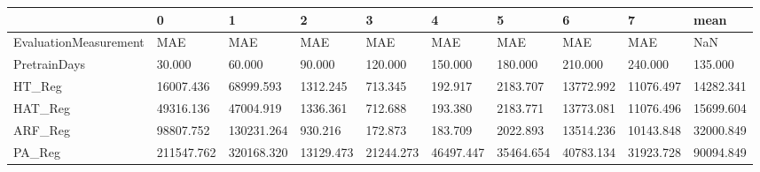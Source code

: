 \begin{tabular}{llllllllll}
\toprule
{} &          0 &          1 &         2 &         3 &         4 &         5 &         6 &         7 &      mean \\
\midrule
EvaluationMeasurement &        MAE &        MAE &       MAE &       MAE &       MAE &       MAE &       MAE &       MAE &       NaN \\
PretrainDays          &     30.000 &     60.000 &    90.000 &   120.000 &   150.000 &   180.000 &   210.000 &   240.000 &   135.000 \\
HT\_Reg                &  16007.436 &  68999.593 &  1312.245 &   713.345 &   192.917 &  2183.707 & 13772.992 & 11076.497 & 14282.341 \\
HAT\_Reg               &  49316.136 &  47004.919 &  1336.361 &   712.688 &   193.380 &  2183.771 & 13773.081 & 11076.496 & 15699.604 \\
ARF\_Reg               &  98807.752 & 130231.264 &   930.216 &   172.873 &   183.709 &  2022.893 & 13514.236 & 10143.848 & 32000.849 \\
PA\_Reg                & 211547.762 & 320168.320 & 13129.473 & 21244.273 & 46497.447 & 35464.654 & 40783.134 & 31923.728 & 90094.849 \\
\bottomrule
\end{tabular}

